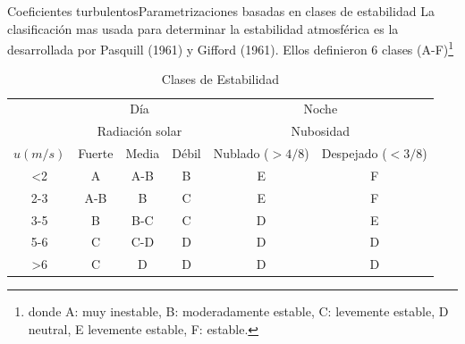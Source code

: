 \begin{frame}{Coeficientes turbulentos}{Parametrizaciones basadas en clases de estabilidad}
La clasificación mas usada para determinar la estabilidad atmosférica es la desarrollada por Pasquill (1961) y Gifford (1961). Ellos definieron 6 clases (A-F)\footnote{donde A: muy inestable, B: moderadamente estable, C: levemente estable, D neutral, E levemente estable, F: estable.}
 
\begin{table}[]
    \centering
\begin{tabular}{| c | c c c | c c |}
\hline
& \multicolumn{3}{c|}{Día} & \multicolumn{2}{c|}{Noche} \\
& \multicolumn{3}{c|}{Radiación solar} & \multicolumn{2}{c|}{Nubosidad} \\
$u (m/s)$ & Fuerte & Media & Débil & Nublado ($> 4/8$) & Despejado ($<3/8$) \\ \hline
<2  & A   & A-B  & B & E & F \\ 
2-3 & A-B & B    & C & E & F \\ 
3-5 & B   & B-C  & C & D & E \\ 
5-6 & C   & C-D  & D & D & D \\ 
>6  & C   & D    & D & D & D \\ \hline
\end{tabular}
    \caption{Clases de Estabilidad}
    \label{tab:my_label}
\end{table}
\end{frame}

 
 
